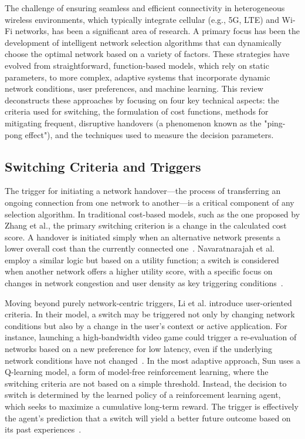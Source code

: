 The challenge of ensuring seamless and efficient connectivity in heterogeneous wireless environments, which typically integrate cellular (e.g., 5G, LTE) and Wi-Fi networks, has been a significant area of research. A primary focus has been the development of intelligent network selection algorithms that can dynamically choose the optimal network based on a variety of factors. These strategies have evolved from straightforward, function-based models, which rely on static parameters, to more complex, adaptive systems that incorporate dynamic network conditions, user preferences, and machine learning. This review deconstructs these approaches by focusing on four key technical aspects: the criteria used for switching, the formulation of cost functions, methods for mitigating frequent, disruptive handovers (a phenomenon known as the "ping-pong effect"), and the techniques used to measure the decision parameters.

\subsection{Switching Criteria and Triggers}

The trigger for initiating a network handover—the process of transferring an ongoing connection from one network to another—is a critical component of any selection algorithm. In traditional cost-based models, such as the one proposed by Zhang et al., the primary switching criterion is a change in the calculated cost score. A handover is initiated simply when an alternative network presents a lower overall cost than the currently connected one~\cite{zhang2015}. Navaratnarajah et al. employ a similar logic but based on a utility function; a switch is considered when another network offers a higher utility score, with a specific focus on changes in network congestion and user density as key triggering conditions~\cite{navaratnarajah2017}.

Moving beyond purely network-centric triggers, Li et al. introduce user-oriented criteria. In their model, a switch may be triggered not only by changing network conditions but also by a change in the user's context or active application. For instance, launching a high-bandwidth video game could trigger a re-evaluation of networks based on a new preference for low latency, even if the underlying network conditions have not changed~\cite{li2018}. In the most adaptive approach, Sun uses a Q-learning model, a form of model-free reinforcement learning, where the switching criteria are not based on a simple threshold. Instead, the decision to switch is determined by the learned policy of a reinforcement learning agent, which seeks to maximize a cumulative long-term reward. The trigger is effectively the agent's prediction that a switch will yield a better future outcome based on its past experiences~\cite{sun2019}.

